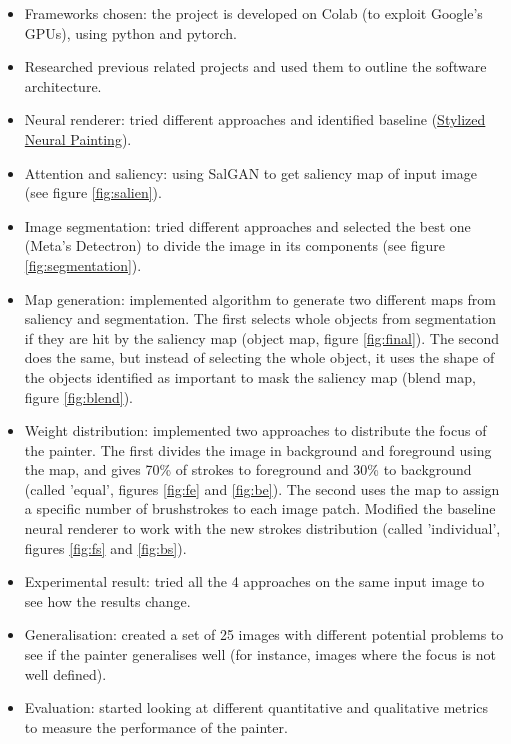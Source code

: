 \documentclass[11pt]{article}
\begin{document}
\begin{itemize}[parsep=0pt]
  \item Frameworks chosen: the project is developed on Colab (to exploit Google's GPUs), using python and pytorch.
  \item Researched previous related projects and used them to outline the software architecture. 
  \item Neural renderer: tried different approaches and identified baseline (\href{https://github.com/jiupinjia/stylized-neural-painting}{Stylized Neural Painting}).
  \item Attention and saliency: using SalGAN to get saliency map of input image (see figure \ref{fig:salien}).
  \item Image segmentation: tried different approaches and selected the best one (Meta's Detectron) to divide the image in its components (see figure \ref{fig:segmentation}).
  \item Map generation: implemented algorithm to generate two different maps from saliency and segmentation. The first selects whole objects from segmentation if they are hit by the saliency map (object map, figure \ref{fig:final}). The second does the same, but instead of selecting the whole object, it uses the shape of the objects identified as important to mask the saliency map (blend map, figure \ref{fig:blend}).
  \item Weight distribution: implemented two approaches to distribute the focus of the painter. The first divides the image in background and foreground using the map, and gives 70\% of strokes to foreground and 30\% to background (called 'equal', figures \ref{fig:fe} and \ref{fig:be}). The second uses the map to assign a specific number of brushstrokes to each image patch. Modified the baseline neural renderer to work with the new strokes distribution (called 'individual', figures \ref{fig:fs} and \ref{fig:bs}).
  \item Experimental result: tried all the 4 approaches on the same input image to see how the results change.
  \item Generalisation: created a set of 25 images with different potential problems to see if the painter generalises well (for instance, images where the focus is not well defined).
  \item Evaluation: started looking at different quantitative and qualitative metrics to measure the performance of the painter.
  
\end{itemize}
\end{document}
